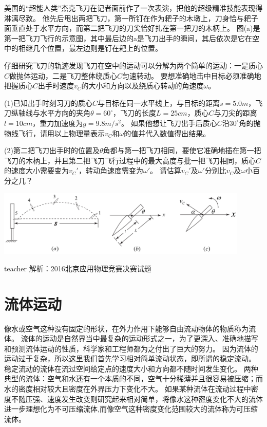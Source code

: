 \begin{example}
美国的“超能人类”杰克飞刀在记者面前作了一次表演，把他的超级精准技能表现得淋漓尽致。
他先后甩出两把飞刀，第一所钉在作为耙子的木墩上，刀身恰与耙子面垂直处于水平方向，而第二把飞刀的刀尖恰好扎在第一把刀的木柄上。
图(a)是第一把飞刀飞行的示意图，其中最后边的a是飞刀出手的瞬间，其后依次是它在空中的相继几个位置，最左边则是钉在耙上的位置。

仔细研究飞刀的轨迹发现飞刀在空中的运动可以分解为两个简单的运动：一是质心$C$做抛体运动，二是飞刀整体绕质心$C$匀速转动。
要想准确地击中目标必须准确地把握质心$C$出手时速度$v_C$的大小和方向以及绕质心转动的角速度$\omega$。 

(1)已知出手时刻习刀的质心$C$与目标在同一水平线上，与目标的距离$s=5.0\unit{m}$，飞刀纵轴线与水平方向的夹角$ \theta=60^\circ$，飞刀的长度$L = 25\unit{cm}$，质心$C$与刀尖的距离$l = 10\unit{cm}$，重力加速度为$g = 9.8\unit{m/s^2}$。
如果他想让飞刀出手后质心$C$沿$30^\circ$角的抛物线飞行，请用以上物理量表示$v_C$和$ \omega$的值并代入数值得出结果。

(2)第二把飞刀出手时的位置及$ \theta$角都与第一把飞刀相同，要使它准确地插在第一把飞刀的木柄上，并且第二把飞刀飞行过程中的最大高度与批一把飞刀相同，质心$C$的速度大小需要变为$v_C'$，转动角速度需变为$ \omega'$。
请估算$v_C'$及$ \omega'$分别比$v_C$及$ \omega$小百分之几？
\begin{center}
\includegraphics[width = 0.9\textwidth]{images/motion-52.pdf} 
\end{center}

\begin{taggedblock}{teacher}
\noindent
解析：2016北京应用物理竞赛决赛试题
\end{taggedblock}
\end{example}


\section{流体运动}
像水或空气这种没有固定的形状，在外力作用下能够自由流动物体的物质称为{\heiti 流体}。
流体的运动是自然界当中最复杂的运动形式之一，为了更深入、准确地描写和预测流体运动的性质，科学家和工程师都为之付出了巨大的努力。
因为流体的运动过于复杂，所以这里我们首先学习相对简单流动状态，即所谓的{\heiti 稳定流动}。
稳定流动的流体在流过空间给定点的速度大小和方向都不随时间发生变化。
两种典型的流体：空气和水还有一个本质的不同，空气十分稀薄并且很容易被压缩；而水的密度相对较大且密度在外界压力下变化不大。
如果某种流体在流动过程中密度不随压强、速度发生改变则研究起来相对简单，将像水这种密度变化不大的流体进一步理想化为{\heiti 不可压缩流体},而像空气这种密度变化范围较大的流体称为{\heiti 可压缩流体}。

